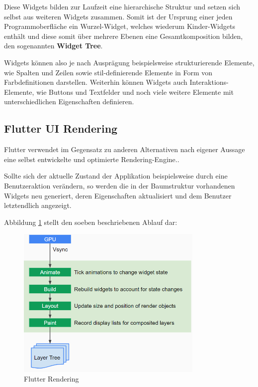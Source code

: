 \documentclass[bibliography=totoc,listof=totoc,BCOR=5mm,DIV=12,oneside]{scrbook}
\begin{document}
\par \bigskip Diese Widgets bilden zur Laufzeit eine hierarchische Struktur und setzen sich selbst aus weiteren Widgets zusammen. Somit ist der Ursprung einer jeden Programmoberfläche ein Wurzel-Widget, welches wiederum Kinder-Widgets enthält und diese somit über mehrere Ebenen eine Gesamtkomposition bilden, den sogenannten \textbf{Widget Tree}. 

\par \bigskip Widgets können also je nach Ausprägung beispielsweise strukturierende Elemente, wie Spalten und Zeilen sowie stil-definierende Elemente in Form von Farbdefinitionen darstellen. Weiterhin können Widgets auch Interaktions-Elemente, wie Buttons und Textfelder und noch viele weitere Elemente mit unterschiedlichen Eigenschaften definieren.

\subsection{Flutter UI Rendering}
\par Flutter verwendet im Gegensatz zu anderen Alternativen nach eigener Aussage eine selbst entwickelte und optimierte Rendering-Engine.\citep{Flu3}. 
\par Sollte sich der aktuelle Zustand der Applikation beispielsweise durch eine Benutzeraktion verändern, so werden die in der Baumstruktur vorhandenen Widgets neu generiert, deren Eigenschaften aktualisiert und dem Benutzer letztendlich angezeigt.

\par \bigskip Abbildung \ref{img:flutterHighLevelRendering} stellt den soeben beschriebenen Ablauf dar:

\bigskip
\begin{figure}[H]
	\centering
	\includegraphics[width=0.8\textwidth, keepaspectratio]{Bilder/FlutterRendering.png}
	\caption{Flutter Rendering \cite{Flu5}}
	\label{img:flutterHighLevelRendering}
\end{figure}
\end{document}

